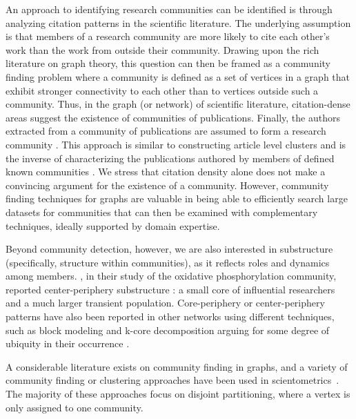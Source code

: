 \documentclass[12pt, oneside]{article}   	%
\begin{document}
An approach to identifying research communities can be identified is through analyzing citation patterns in the scientific literature. The underlying assumption is that members of a research community are more likely to cite each other's work than the work from outside their community.  Drawing upon the rich literature on graph theory, this question can then be framed as a community finding problem where a community is defined as a set of vertices in a graph that exhibit stronger connectivity to each other than to vertices outside such a community. Thus, in the graph (or network) of scientific literature, citation-dense areas suggest the existence of communities of publications. Finally, the authors extracted from a community of publications are assumed to form a research community \citep{Chandrasekharan2021,Wedell2022}. This approach is similar to constructing article level clusters \citep{Waltman2012,Traag2019} and is the inverse of characterizing the publications authored by members of defined known communities \citep{Price1966,crane1972invisible,small_specialties_1979,Mullins_1985}. We stress that citation density alone does not make a convincing argument for the existence of a community. However, community finding techniques for graphs are valuable in being able to efficiently search large datasets for communities that can then be examined with complementary techniques, ideally supported by domain expertise.

Beyond community detection, however, we are also interested in substructure (specifically, structure within communities), as it reflects roles and dynamics among members. \cite{Price1966}, in their study of the oxidative phosphorylation community, reported center-periphery substructure \citep{Breiger2014}: a small core of influential researchers and a much larger transient population. Core-periphery or center-periphery patterns have also been reported in other networks using different techniques, such as block modeling and k-core decomposition arguing for some degree of ubiquity in their occurrence \citep{borgatti2000models,Rombach2017,gallagher2021clarified,yanchenko_2202.04455}. 

A considerable literature exists on community finding in graphs, and a variety of community finding or clustering approaches have been used in scientometrics~\citep{Newman2006,Fortunato2009,Boyack2010,Boyack2019,Traag2019,Ahlgren2020,Chandrasekharan2021,Wedell2022}. The majority of these approaches focus on disjoint partitioning, where a vertex is only assigned to one community. 
\end{document}
